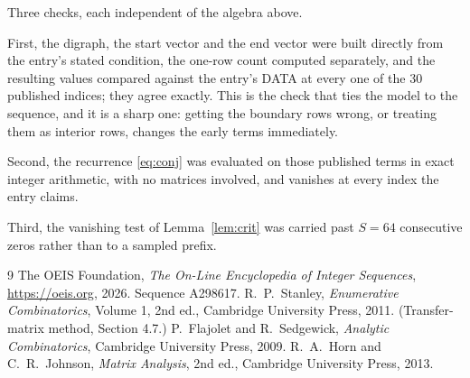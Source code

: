 \documentclass[11pt,a4paper]{article}
\theoremstyle{plain}
\theoremstyle{definition}
\begin{document}
Three checks, each independent of the algebra above.

First, the digraph, the start vector and the end vector were built directly from the
entry's stated condition, the one-row count computed separately, and the resulting values
compared against the entry's DATA at every one of the $30$ published indices; they
agree exactly. This is the check that ties the model to the sequence, and it is a sharp one:
getting the boundary rows wrong, or treating them as interior rows, changes the early terms
immediately.

Second, the recurrence \eqref{eq:conj} was evaluated on those published terms in exact
integer arithmetic, with no matrices involved, and vanishes at every index the entry claims.

Third, the vanishing test of Lemma~\ref{lem:crit} was carried past $S=64$ consecutive
zeros rather than to a sampled prefix.

\begin{thebibliography}{9}
 The OEIS Foundation, \emph{The On-Line Encyclopedia of Integer
Sequences}, \url{https://oeis.org}, 2026. Sequence A298617.
 R.~P.~Stanley, \emph{Enumerative Combinatorics}, Volume 1, 2nd ed.,
Cambridge University Press, 2011. (Transfer-matrix method, Section 4.7.)
 P.~Flajolet and R.~Sedgewick, \emph{Analytic Combinatorics}, Cambridge
University Press, 2009.
 R.~A.~Horn and C.~R.~Johnson, \emph{Matrix Analysis}, 2nd ed., Cambridge
University Press, 2013.
\end{thebibliography}
\end{document}
